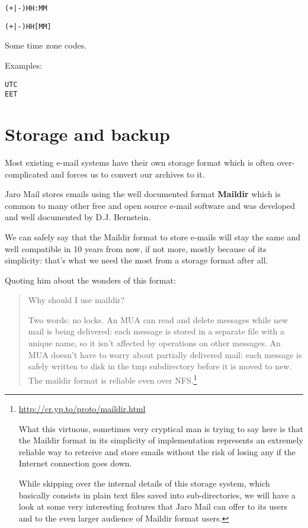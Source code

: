 \documentclass[a4,onecolumn,portrait]{article}
\begin{document}
\begin{verbatim}
(+|-)HH:MM
\end{verbatim}

\begin{verbatim}
(+|-)HH[MM]
\end{verbatim}

Some time zone codes.

Examples:

\begin{verbatim}
UTC
EET
\end{verbatim}

\section{Storage and backup}
\label{sec-9}

Most existing e-mail systems have their own storage format which is
often over-complicated and forces us to convert our archives to it.

Jaro Mail stores emails using the well documented format \textbf{Maildir}
which is common to many other free and open source e-mail software and
was developed and well documented by D.J. Bernstein.

We can safely say that the Maildir format to store e-mails will stay
the same and well compatible in 10 years from now, if not more, mostly
because of its simplicity: that's what we need the most from a storage
format after all.

Quoting him about the wonders of this format:

\begin{quote}


Why should I use maildir?

Two words: no locks. An MUA can read and delete messages while new
mail is being delivered: each message is stored in a separate file
with a unique name, so it isn't affected by operations on other
messages. An MUA doesn't have to worry about partially delivered mail:
each message is safely written to disk in the tmp subdirectory before
it is moved to new. The maildir format is reliable even over NFS.\footnote{\url{http://cr.yp.to/proto/maildir.html}

What this virtuous, sometimes very cryptical man is trying to say here
is that the Maildir format in its simplicity of implementation
represents an extremely reliable way to retreive and store emails
without the risk of losing any if the Internet connection goes down.

While skipping over the internal details of this storage system, which
basically consists in plain text files saved into sub-directories, we
will have a look at some very interesting features that Jaro Mail can
offer to its users and to the even larger audience of Maildir format
users.}
\end{quote}
\end{document}
